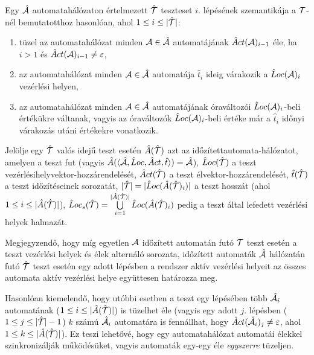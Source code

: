 Egy $\hat{\mathcal{A}}$ automatahálózaton értelmezett $\hat{\mathcal{T}}$ teszteset $i.$ lépésének szemantikája a $\mathcal{T}$-nél bemutatotthoz hasonlóan, ahol $1 \leq i \leq |\hat{\mathcal{T}}|$:
\begin{enumerate}
    \item tüzel az automatahálózat minden $\mathcal{A} \in \hat{\mathcal{A}}$ automatájának $\hat{A}ct(\mathcal{A})_{i - 1}$ éle, ha $i > 1$ és $\hat{A}ct(\mathcal{A})_{i - 1} \neq \varepsilon$,
    \item az automatahálózat minden $\mathcal{A} \in \hat{\mathcal{A}}$ automatája $\hat{t}_i$ ideig várakozik a $\hat{L}oc(\mathcal{A})_{i}$ vezérlési helyen,
    \item az automatahálózat minden $\mathcal{A} \in \hat{\mathcal{A}}$ automatájának óraváltozói $\hat{L}oc(\mathcal{A})_{i}$-beli értékükre váltanak, vagyis az óraváltozók $\hat{L}oc(\mathcal{A})_{i}$-beli értéke már a $\hat{t}_i$ időnyi várakozás utáni értékekre vonatkozik.
\end{enumerate}

Jelölje egy $\hat{\mathcal{T}}$ valós idejű teszt esetén $\hat{A}(\hat{\mathcal{T}})$ azt az időzítettautomata-hálózatot, amelyen a teszt fut (vagyis $\hat{A}(\langle \hat{\mathcal{A}}, \hat{L}oc, \hat{A}ct, \hat{t} \rangle) = \hat{\mathcal{A}}$), $\hat{L}oc(\hat{\mathcal{T}})$ a teszt vezérlésihelyvektor-hozzárendelését, $\hat{A}ct(\hat{\mathcal{T}})$ a teszt élvektor-hozzárendelését, $\hat{t}(\hat{\mathcal{T}})$ a teszt időzítéseinek sorozatát, $|\hat{\mathcal{T}}| = |\hat{L}oc(\hat{A}(\hat{\mathcal{T}})_i)|$ a teszt hosszát (ahol $1 \leq i \leq |\hat{A}(\hat{\mathcal{T}})|$), $\hat{L}oc_s(\hat{\mathcal{T}}) = \bigcup\limits_{i = 1}^{|\hat{A}(\hat{\mathcal{T}})|} \hat{L}oc(\hat{A}(\hat{\mathcal{T}})_i)$ pedig a teszt által lefedett vezérlési helyek halmazát.

Megjegyzendő, hogy míg egyetlen $\mathcal{A}$ időzített automatán futó $\mathcal{T}$ teszt esetén a teszt vezérlési helyek és élek alternáló sorozata, időzített automaták $\hat{\mathcal{A}}$ hálózatán futó $\hat{\mathcal{T}}$ teszt esetén egy adott lépésben a rendszer aktív vezérlési helyeit az összes automata aktív vezérlési helye együttesen határozza meg.

Hasonlóan kiemelendő, hogy utóbbi esetben a teszt egy lépésében több $\hat{\mathcal{A}}_i$ automatának ($1 \leq i \leq |\hat{A}(\hat{\mathcal{T}})|$) is tüzelhet éle (vagyis egy adott $j.$ lépésben ($1 \leq j \leq |\hat{\mathcal{T}}| - 1$) $k$ számú $\hat{\mathcal{A}}_i$ automatára is fennállhat, hogy $\hat{A}ct(\hat{\mathcal{A}}_i)_j \neq \varepsilon$, ahol $1 \leq k \leq |\hat{A}(\hat{\mathcal{T}})|$). Ez teszi lehetővé, hogy egy automatahálózat automatái élekkel szinkronizálják működésüket, vagyis automaták egy-egy éle \emph{egyszerre} tüzeljen.

